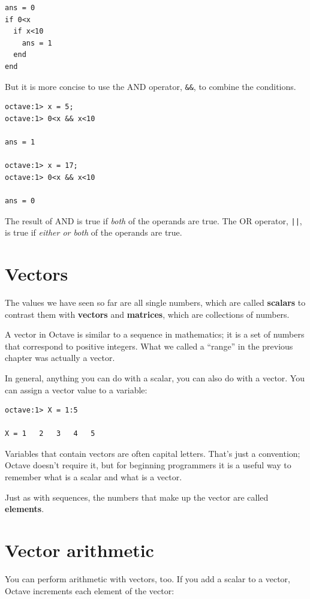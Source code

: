 \documentclass{book}
\begin{document}
\begin{verbatim}
ans = 0
if 0<x
  if x<10
    ans = 1
  end
end
\end{verbatim}

But it is more concise to use the AND operator, {\tt \&\&}, to
combine the conditions.

\begin{verbatim}
octave:1> x = 5;
octave:1> 0<x && x<10

ans = 1

octave:1> x = 17;
octave:1> 0<x && x<10

ans = 0
\end{verbatim}

The result of AND is true if {\em both} of the operands are
true. The OR operator, {\tt ||}, is true if {\em either or both}
of the operands are true.


\section{Vectors}

The values we have seen so far are all single numbers,
which are called {\bf scalars} to contrast them with {\bf vectors}
and {\bf matrices}, which are collections of numbers.

A vector in Octave is similar to a sequence in mathematics;
it is a set of numbers that correspond to positive integers. 
What
we called a ``range'' in the previous chapter was actually a
vector.

In general, anything you can do with a scalar, you can also do with
a vector. You can assign a vector value to a variable:

\begin{verbatim}
octave:1> X = 1:5

X = 1   2   3   4   5
\end{verbatim}

Variables that contain vectors are often capital letters. That's
just a convention; Octave doesn't require it, but for beginning
programmers it is a useful way to remember what is a scalar and
what is a vector.

Just as with sequences, the numbers that make up the vector are called
{\bf elements}.


\section{Vector arithmetic}

You can perform arithmetic with vectors, too. If you add a scalar
to a vector, Octave increments each element of the vector:
\end{document}
